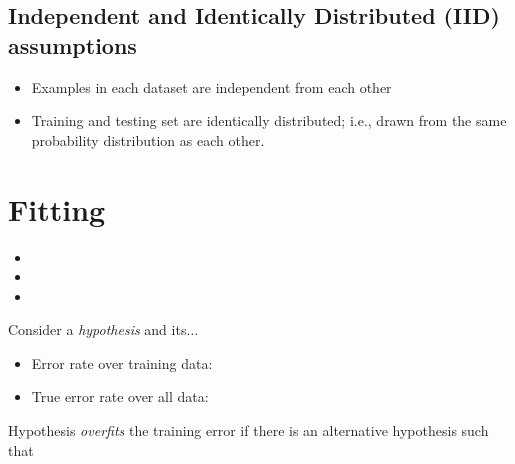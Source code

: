 \documentclass[
	number={1},
	title={Machine Learning Fundamentals}
]{cs584notes}
\begin{document}
\subsection{Independent and Identically Distributed (IID) assumptions}\label{subsec:iid-assumptions}
\begin{itemize}
	\item Examples in each dataset are independent from each other
	\item Training and testing set are identically distributed; i.e., drawn from the same probability distribution as each other.
\end{itemize}

\section{Fitting}\label{sec:fitting}
\begin{itemize}
	\item {}
	\item {}
	\item {}
\end{itemize}

Consider a \emph{hypothesis } and its$\dots$
\begin{itemize}
	\item Error rate over training data: 
	\item True error rate over all data: 
\end{itemize}

Hypothesis  \emph{overfits} the training error if there is an alternative hypothesis  such that
\end{document}
